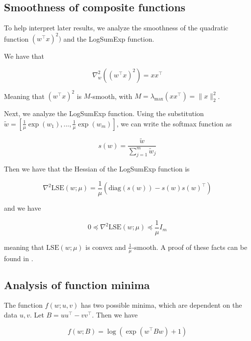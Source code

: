 \documentclass[11pt]{article}
\begin{document}
\subsection{Smoothness of composite functions}

To help interpret later results, we analyze the smoothness of the quadratic function $(w^{\top} x)^2)$ and the LogSumExp function.

We have that

\begin{equation}
    \nabla_w^2 ((w^{\top} x)^2) = xx^{\top}
\end{equation}

Meaning that $(w^{\top} x)^2$ is $M$-smooth, with $M = \lambda_{\max}(xx^{\top}) = \|x\|_2^2$.

Next, we analyze the LogSumExp function. Using the substitution $\tilde{w} = [\frac{1}{\mu}\exp(w_1), ..., \frac{1}{\mu}\exp(w_m)]$, we can write the softmax function as

\begin{equation}
    s(w) = \frac{\tilde{w}}{\sum_{j=1}^{m} \tilde{w}_j}
\end{equation}

Then we have that the Hessian of the LogSumExp function is

\begin{equation}
    \nabla^2 \textrm{LSE}(w; \mu) = \frac{1}{\mu} (\textrm{diag}(s(w)) - s(w)s(w)^{\top}) 
\end{equation}

and we have

\begin{equation}
    0 \preceq \nabla^2 \textrm{LSE}(w; \mu) \preceq \frac{1}{\mu} I_m
\end{equation}

meaning that $\textrm{LSE}(w; \mu)$ is convex and $\frac{1}{\mu}$-smooth. A proof of these facts can be found in \cite{gao_properties_2018}.

\subsection{Analysis of function minima}

The function $f(w; u, v)$ has two possible minima, which are dependent on the data $u, v$. Let $B = uu^{\top} - vv^{\top}$. Then we have

\begin{equation}
    f(w; B) = \log(\exp(w^{\top}Bw) + 1)
\end{equation}
\end{document}
